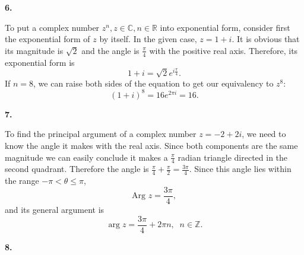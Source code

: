 \documentclass{article}
\newcommand{\qnumber}[1]{
\vspace{0.5cm}
\noindent
\textbf{#1.}
\vspace{4mm}
}
\begin{document}
\qnumber{6}

To put a complex number $z^n, z\in\mathbb{C}, n\in\mathbb{R}$ into exponential form, consider first the exponential form of $z$ by itself. In the given case, $z=1+i$. It is obvious that its magnitude is $\sqrt{2}$ and the angle is $\frac{\pi}{4}$ with the positive real axis. Therefore, its exponential form is
\[
    1+i=\sqrt{2}e^{ i\frac{\pi}{4} }.  
\]
If $n=8$, we can raise both sides of the equation to get our equivalency to $z^8$:
\[
    (1+i)^8=16 e^{ 2\pi i }=16.
\]

\qnumber{7}

To find the principal argument of a complex number $z=-2+2i$, we need to know the angle it makes with the real axis. Since both components are the same magnitude we can easily conclude it makes a $\frac{\pi}{4}$ radian triangle directed in the second quadrant. Therefore the angle is $\frac{\pi}{4}+\frac{\pi}{2}=\frac{3\pi}{4}$. Since this angle lies within the range $-\pi<\theta\leq\pi$, 
\[
    \text{Arg } z = \frac{3\pi}{4},  
\]
and its general argument is
\[
    \arg z = \frac{3\pi}{4} + 2\pi n,\;\;n\in\mathbb{Z}.  
\]

\qnumber{8}

\begin{figure}[h]
    \centering
    
    
\end{figure}
\end{document}
